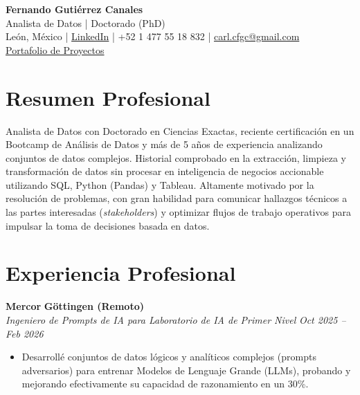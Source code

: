 \documentclass[10pt,a4paper]{article}
\begin{document}
\begin{center}
    {\Huge \textbf{Fernando Gutiérrez Canales}}\\
    {\Large Analista de Datos | Doctorado (PhD)}\\    
    León, México \quad | \quad \href{https://www.linkedin.com/in/fernando-guti%C3%A9rrez-canales-804876343/}{LinkedIn} \quad | \quad +52 1 477 55 18 832 \quad | \quad \href{mailto:carl.cfgc@gmail.com}{carl.cfgc@gmail.com} \\
     \href{https://fernando-canales.github.io/es/#projects}{Portafolio de Proyectos}
\end{center}

\vspace{1em}

\section*{Resumen Profesional}
Analista de Datos con Doctorado en Ciencias Exactas, reciente certificación en un Bootcamp de Análisis de Datos y más de 5 años de experiencia analizando conjuntos de datos complejos. Historial comprobado en la extracción, limpieza y transformación de datos sin procesar en inteligencia de negocios accionable utilizando SQL, Python (Pandas) y Tableau. Altamente motivado por la resolución de problemas, con gran habilidad para comunicar hallazgos técnicos a las partes interesadas (\textit{stakeholders}) y optimizar flujos de trabajo operativos para impulsar la toma de decisiones basada en datos.

\section*{Experiencia Profesional}
\textbf{Mercor} \hfill \textbf{Göttingen (Remoto)} \\
\textit{Ingeniero de Prompts de IA para Laboratorio de IA de Primer Nivel} \hfill \textit{Oct 2025 -- Feb 2026}
\begin{itemize}[leftmargin=1.5em]
	\item Desarrollé conjuntos de datos lógicos y analíticos complejos (prompts adversarios) para entrenar Modelos de Lenguaje Grande (LLMs), probando y mejorando efectivamente su capacidad de razonamiento en un 30\%.
\end{itemize}
\end{document}
